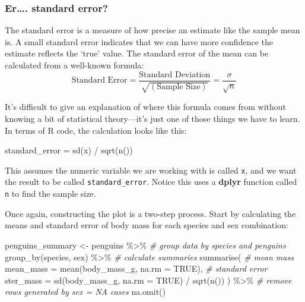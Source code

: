 \documentclass[
]{book}
\newenvironment{Shaded}{\begin{snugshade}}{\end{snugshade}}
\newcommand{\AttributeTok}[1]{\textcolor[rgb]{0.77,0.63,0.00}{#1}}
\newcommand{\CommentTok}[1]{\textcolor[rgb]{0.56,0.35,0.01}{\textit{#1}}}
\newcommand{\ConstantTok}[1]{\textcolor[rgb]{0.00,0.00,0.00}{#1}}
\newcommand{\FunctionTok}[1]{\textcolor[rgb]{0.00,0.00,0.00}{#1}}
\newcommand{\NormalTok}[1]{#1}
\newcommand{\OtherTok}[1]{\textcolor[rgb]{0.56,0.35,0.01}{#1}}
\newcommand{\SpecialCharTok}[1]{\textcolor[rgb]{0.00,0.00,0.00}{#1}}
\newenvironment{greybox}{
  \definecolor{shadecolor}{rgb}{0.95,0.95,0.95}  %
  \color{black}
  \begin{shaded}}
 {\end{shaded}}
\newenvironment{infobox}[1]
  {
  \begin{itemize}
  \renewcommand{\labelitemi}{
    \raisebox{-.7\height}[0pt][0pt]{
      {\setkeys{Gin}{width=3em,keepaspectratio}
        \texttt{[image: images/\#1]}}
    }
  }
  \setlength{\fboxsep}{1em}
  \begin{greybox}
  \item
  }
  {
  \end{greybox}
  \end{itemize}
  }
\begin{document}
\begin{infobox}{information}

\hypertarget{er.-standard-error}{%
\subsubsection*{Er\ldots. standard error?}\label{er.-standard-error}}

The standard error is a measure of how precise an estimate like the sample mean is. A small standard error indicates that we can have more confidence the estimate reflects the `true' value. The standard error of the mean can be calculated from a well-known formula: \[
\text{Standard Error} = \frac{\text{Standard Deviation}}{\sqrt{(\text{Sample Size})}} = \frac{\sigma}{\sqrt{n}}
\]

It's difficult to give an explanation of where this formula comes from without knowing a bit of statistical theory---it's just one of those things we have to learn. In terms of R code, the calculation looks like this:

\begin{Shaded}
\begin{Highlighting}[]
\NormalTok{standard\_error }\OtherTok{=} \FunctionTok{sd}\NormalTok{(x) }\SpecialCharTok{/} \FunctionTok{sqrt}\NormalTok{(}\FunctionTok{n}\NormalTok{())}
\end{Highlighting}
\end{Shaded}

This assumes the numeric variable we are working with is called \texttt{x}, and we want the result to be called \texttt{standard\_error}. Notice this uses a \textbf{dplyr} function called \texttt{n} to find the sample size.

\end{infobox}

Once again, constructing the plot is a two-step process. Start by calculating the means and standard error of body mass for each species and sex combination:

\begin{Shaded}
\begin{Highlighting}[]
\NormalTok{penguins\_summary }\OtherTok{\textless{}{-}}\NormalTok{ penguins }\SpecialCharTok{\%\textgreater{}\%} 
  \CommentTok{\# group data by species and penguins}
  \FunctionTok{group\_by}\NormalTok{(species, sex) }\SpecialCharTok{\%\textgreater{}\%} 
  \CommentTok{\# calculate summaries}
  \FunctionTok{summarise}\NormalTok{(}
    \CommentTok{\# mean mass}
    \AttributeTok{mean\_mass =} \FunctionTok{mean}\NormalTok{(body\_mass\_g, }\AttributeTok{na.rm =} \ConstantTok{TRUE}\NormalTok{),}
    \CommentTok{\# standard error}
    \AttributeTok{ster\_mass =} \FunctionTok{sd}\NormalTok{(body\_mass\_g, }\AttributeTok{na.rm =} \ConstantTok{TRUE}\NormalTok{) }\SpecialCharTok{/} \FunctionTok{sqrt}\NormalTok{(}\FunctionTok{n}\NormalTok{())}
\NormalTok{  ) }\SpecialCharTok{\%\textgreater{}\%} 
  \CommentTok{\# remove rows generated by sex = NA cases}
  \FunctionTok{na.omit}\NormalTok{()}
\end{Highlighting}
\end{Shaded}
\end{document}
